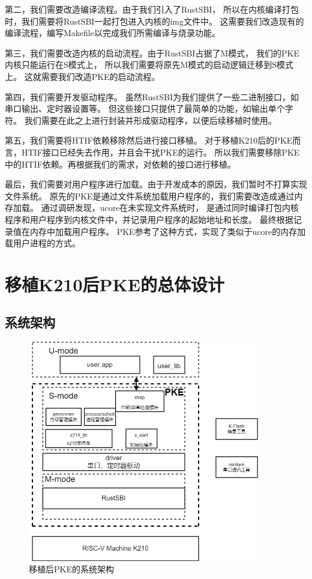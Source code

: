 第二，我们需要改造编译流程。由于我们引入了RustSBI，
所以在内核编译打包时，我们需要将RustSBI一起打包进入内核的img文件中。
这需要我们改造现有的编译流程，编写Makefile以完成我们所需编译与烧录功能。

第三，我们需要改造内核的启动流程。由于RustSBI占据了M模式，
我们的PKE内核只能运行在S模式上，
所以我们需要将原先M模式的启动逻辑迁移到S模式上。
这就需要我们改造PKE的启动流程。

第四，我们需要开发驱动程序。
虽然RustSBI为我们提供了一些二进制接口，如串口输出、定时器设置等。
但这些接口只提供了最简单的功能，如输出单个字符。
我们需要在此之上进行封装并形成驱动程序，以便后续移植时使用。

第五，我们需要将HTIF依赖移除然后进行接口移植。
对于移植K210后的PKE而言，HTIF接口已经失去作用，并且会干扰PKE的运行。
所以我们需要移除PKE中的HTIF依赖。再根据我们的需求，对依赖的接口进行移植。

最后，我们需要对用户程序进行加载。由于开发成本的原因，我们暂时不打算实现文件系统。
原先的PKE是通过文件系统加载用户程序的，我们需要改造成通过内存加载。
通过调研发现，ucore在未实现文件系统时，
是通过同时编译打包内核程序和用户程序到内核文件中，并记录用户程序的起始地址和长度。
最终根据记录值在内存中加载用户程序。
PKE参考了这种方式，实现了类似于ucore的内存加载用户进程的方式。

\section{移植K210后PKE的总体设计}

\subsection{系统架构}

\begin{figure}[h]
    \vspace{13pt} %
    \centering
    \includegraphics[width=0.9\textwidth]{images/after_sys_struct.drawio.png}
    \caption{移植后PKE的系统架构}\label{移植后PKE的系统架构} %
\end{figure}

